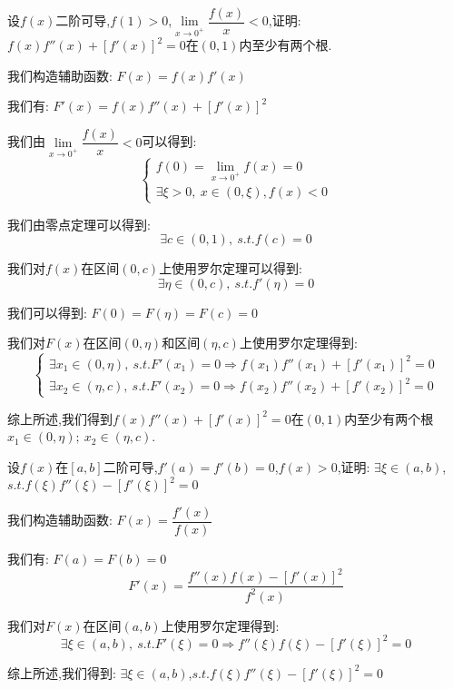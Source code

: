 \begin{proposition}
	设$f(x)$二阶可导,$f(1)> 0$,$\lim\limits_{x\rightarrow 0^{+}}\dfrac{f(x)}{x}<0$,证明: $f(x)f''(x)+[f'(x)]^2=0$在$(0,1)$内至少有两个根.
\end{proposition}
\begin{solution}

	我们构造辅助函数: $F(x)=f(x)f'(x)$

	我们有: $F'(x)=f(x)f''(x)+[f'(x)]^2$

	我们由$\lim\limits_{x\rightarrow 0^{+}}\dfrac{f(x)}{x}<0$可以得到:
	$$\left\lbrace
		\begin{array}{l}
			f(0)=\lim\limits_{x\rightarrow 0^{+}}f(x)=0 \\
			\exists\xi>0,\ x\in(0,\xi),f(x)<0
		\end{array}
		\right. $$

	我们由零点定理可以得到:
	$$\exists c\in(0,1),\ s.t. f(c)=0$$

	我们对$f(x)$在区间$(0,c)$上使用罗尔定理可以得到:
	$$\exists\eta\in(0,c),\ s.t. f'(\eta)=0$$

	我们可以得到: $F(0)=F(\eta)=F(c)=0$

	我们对$F(x)$在区间$(0,\eta)$和区间$(\eta,c)$上使用罗尔定理得到:
	$$\left\lbrace
		\begin{array}{l}
			\exists x_{1}\in(0,\eta),\ s.t. F'(x_{1})=0\Rightarrow f(x_{1})f''(x_{1})+[f'(x_{1})]^2=0 \\
			\exists x_{2}\in(\eta,c),\ s.t. F'(x_{2})=0\Rightarrow f(x_{2})f''(x_{2})+[f'(x_{2})]^2=0
		\end{array}
		\right. $$

	综上所述,我们得到$f(x)f''(x)+[f'(x)]^2=0$在$(0,1)$内至少有两个根$x_{1}\in(0,\eta);\ x_{2}\in(\eta,c)$.
\end{solution}


\begin{proposition}
	设$f(x)$在$[a,b]$二阶可导,$f'(a)=f'(b)=0$,$f(x)>0$,证明: $\exists \xi\in(a,b)$,$s.t. f(\xi)f''(\xi)-[f'(\xi)]^2=0$
\end{proposition}
\begin{solution}

	我们构造辅助函数: $F(x)=\dfrac{f'(x)}{f(x)}$

	我们有: $F(a)=F(b)=0$
	$$F'(x)=\dfrac{f''(x)f(x)-[f'(x)]^2}{f^{2}(x)}$$

	我们对$F(x)$在区间$(a,b)$上使用罗尔定理得到:
	$$\exists \xi\in(a,b),\ s.t. F'(\xi)=0\Rightarrow f''(\xi)f(\xi)-[f'(\xi)]^2=0$$

	综上所述,我们得到: $\exists \xi\in(a,b)$,$s.t. f(\xi)f''(\xi)-[f'(\xi)]^2=0$
\end{solution}

